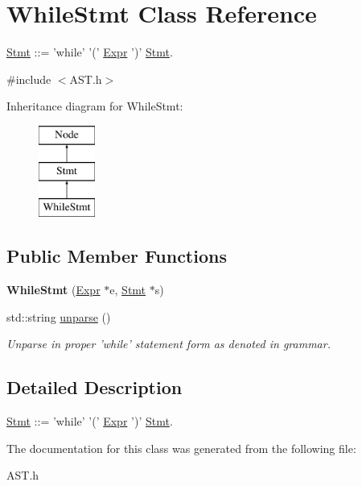 \hypertarget{classWhileStmt}{\section{While\-Stmt Class Reference}
\label{classWhileStmt}
}


\hyperlink{classStmt}{Stmt} \-:\-:= 'while' '(' \hyperlink{classExpr}{Expr} ')' \hyperlink{classStmt}{Stmt}.  




{\ttfamily \#include $<$A\-S\-T.\-h$>$}

Inheritance diagram for While\-Stmt\-:\begin{figure}[H]
\begin{center}
\leavevmode
\includegraphics[height=3.000000cm]{classWhileStmt}
\end{center}
\end{figure}
\subsection*{Public Member Functions}
\begin{DoxyCompactItemize}
\item 
\hypertarget{classWhileStmt_a6583cdbdcb6c53a5d0dd0b0c6507ed18}{{\bfseries While\-Stmt} (\hyperlink{classExpr}{Expr} $\ast$e, \hyperlink{classStmt}{Stmt} $\ast$s)}\label{classWhileStmt_a6583cdbdcb6c53a5d0dd0b0c6507ed18}

\item 
\hypertarget{classWhileStmt_acf3bd2eb99735445a3f8b0e2faa27a29}{std\-::string \hyperlink{classWhileStmt_acf3bd2eb99735445a3f8b0e2faa27a29}{unparse} ()}\label{classWhileStmt_acf3bd2eb99735445a3f8b0e2faa27a29}

\begin{DoxyCompactList}\small\item\em Unparse in proper 'while' statement form as denoted in grammar. \end{DoxyCompactList}\end{DoxyCompactItemize}


\subsection{Detailed Description}
\hyperlink{classStmt}{Stmt} \-:\-:= 'while' '(' \hyperlink{classExpr}{Expr} ')' \hyperlink{classStmt}{Stmt}. 

The documentation for this class was generated from the following file\-:\begin{DoxyCompactItemize}
\item 
A\-S\-T.\-h\end{DoxyCompactItemize}
